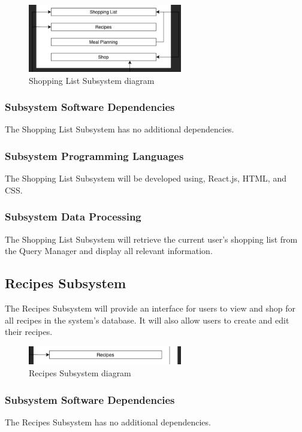 \begin{figure}[h!]
	\centering
 	\includegraphics[width=0.60\textwidth]{images/shoppingList}
 \caption{Shopping List Subsystem diagram}
\end{figure}

\subsubsection{Subsystem Software Dependencies}
The Shopping List Subsystem has no additional dependencies.

\subsubsection{Subsystem Programming Languages}
The Shopping List Subsystem will be developed using, React.js, HTML, and CSS.

\subsubsection{Subsystem Data Processing}
The Shopping List Subsystem will retrieve the current user's shopping list from the Query Manager and display all relevant information.

\subsection{Recipes Subsystem}
The Recipes Subsystem will provide an interface for users to view and shop for all recipes in the system's database. It will also allow users to create and edit their recipes.

\begin{figure}[h!]
	\centering
 	\includegraphics[width=0.60\textwidth]{images/recipes}
 \caption{Recipes Subsystem diagram}
\end{figure}

\subsubsection{Subsystem Software Dependencies}
The Recipes Subsystem has no additional dependencies.

